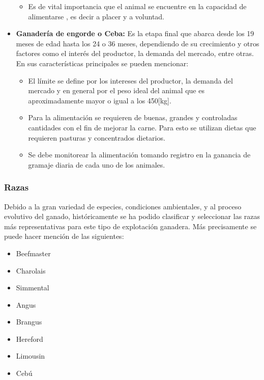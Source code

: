 \begin{itemize}
\begin{itemize}
		\item Es de vital importancia que el animal se encuentre en la capacidad de  alimentarse , es decir a placer y a voluntad.\\
	\end{itemize} 
	\item \textbf{Ganadería de engorde o Ceba:} Es la etapa final que abarca desde los 19 meses de edad hasta los 24 o 36 meses, dependiendo de su crecimiento  y otros factores como el interés del productor, la demanda del mercado, entre otras. En sus características principales se pueden mencionar:
	\begin{itemize}
		\item El límite se define por los intereses del productor, la demanda del mercado y en general por el peso ideal del animal que es aproximadamente mayor o igual a los 450[kg].
		\item Para la alimentación se requieren de buenas, grandes y controladas cantidades con el fin de mejorar la carne. Para esto se utilizan dietas que requieren pasturas y concentrados dietarios.
		\item Se debe monitorear la alimentación tomando registro en la ganancia de gramaje diaria de cada uno de los animales.
	\end{itemize}
\end{itemize} 

\subsubsection{Razas} Debido a la gran variedad de especies, condiciones ambientales, y al proceso evolutivo del ganado, históricamente se ha podido clasificar y seleccionar las razas más representativas para este tipo de explotación ganadera. Más precisamente se puede hacer mención de las siguientes:
\begin{multicols}{4}
\begin{center}
\begin{itemize}
\item Beefmaster
\item Charolais
\item Simmental
\item Angus
\item Brangus
\item Hereford
\item Limousin
\item Cebú
\end{itemize}
\end{center}
\end{multicols}

